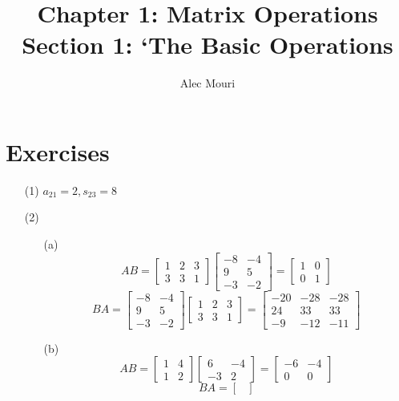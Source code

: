 \documentclass[12pt]{article}
\begin{document}
\title{Chapter 1: Matrix Operations \\ Section 1: `The Basic Operations}
\author{Alec Mouri}

\maketitle
\section*{Exercises}
\begin{itemize}
\item[(1)]
$a_{21} = 2, s_{23} = 8$
\item[(2)]
\begin{itemize}
\item[(a)]
$$AB = \begin{bmatrix}
1 & 2 & 3 \\
3 & 3 & 1
\end{bmatrix}\begin{bmatrix}
-8 & -4 \\
9 & 5 \\
-3 & -2
\end{bmatrix} = \begin{bmatrix}
1 & 0 \\
0 & 1
\end{bmatrix}$$
$$BA = \begin{bmatrix}
-8 & -4 \\
9 & 5 \\
-3 & -2
\end{bmatrix}\begin{bmatrix}
1 & 2 & 3 \\
3 & 3 & 1
\end{bmatrix} = \begin{bmatrix}
-20 & -28 & - 28 \\
24 & 33 & 33 \\
-9 & -12 & -11
\end{bmatrix}$$
\item[(b)]
$$AB = \begin{bmatrix}
1 & 4 \\
1 & 2
\end{bmatrix}\begin{bmatrix}
6 & -4 \\
-3 & 2
\end{bmatrix} = \begin{bmatrix}
-6 & -4 \\
0 & 0
\end{bmatrix}$$
$$BA = \begin{bmatrix}

\end{bmatrix}$$
\end{itemize}
\end{itemize}
\end{document}
